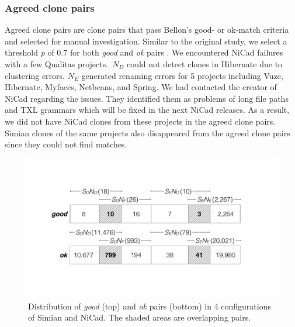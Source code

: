 \documentclass{sig-alternate-05-2015}
\begin{document}
\subsubsection{Agreed clone pairs}

Agreed clone pairs are clone pairs that pass Bellon's good- or ok-match criteria and selected for manual investigation. Similar to the original study, we select a threshold \textit{p} of 0.7 for both \textit{good} and \textit{ok} pairs \cite{Bellon2007}. %
We encountered NiCad failures with a few Qualitas projects.~$N_D$ could not detect clones in Hibernate due to clustering errors. $N_E$ generated renaming errors for 5 projects including Vuze, Hibernate, Myfaces, Netbeans, and Spring. We had contacted the creator of NiCad regarding the issues. They identified them as problems of long file paths and TXL grammars which will be fixed in the next NiCad releases. As a result, we did not have NiCad clones from these projects in the agreed clone pairs. Simian clones of the same projects also disappeared from the agreed clone pairs since they could not find matches.

\begin{table}
	\centering
	\caption{Distribution of the agreed clone pairs}
	\label{t_agreed_good_clone_pairs}
	\small
\end{table}

\begin{figure}
	\centering
	\includegraphics[width=\linewidth]{good-ok_pairs-crop}
	\caption{Distribution of \textit{good} (top) and \textit{ok} pairs (bottom) in 4 configurations of Simian and NiCad. The shaded areas are overlapping pairs.}
	\label{fig:good-ok-pairs}
\end{figure}
\end{document}
